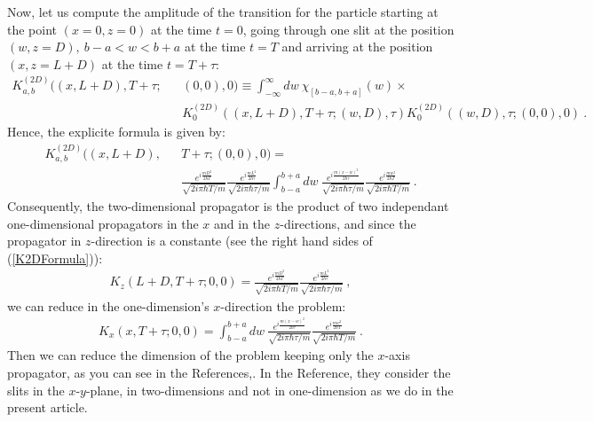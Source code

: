 \documentclass[12pt,aps,prb,preprint]{revtex4-1}   %
\begin{document}
Now, let us compute the amplitude of the transition for the particle 
starting at the point $(x=0,z=0)$ at the time $t=0$,
going through one slit at the position $(w,z=D),\ b-a<w<b+a$ at the time $t=T$
and arriving at the position $(x,z=L+D)$ at the time $t=T+\tau$: 
\begin{eqnarray*}
K_{a,b}^{(2D)}((x,L+D),T+\tau;&&(0,0),0)
\equiv\int_{-\infty}^{\infty}dw\ \chi_{[b-a,b+a]}(w)\times
{}\nonumber\\{}&&K_0^{(2D)}\left((x,L+D),T+\tau;(w,D),\tau\right)K_0^{(2D)}\left((w,D),\tau;(0,0),0\right)\ .
\end{eqnarray*}
Hence, the explicite formula is given by:
\begin{eqnarray}\label{K2DFormula}
K_{a,b}^{(2D)}((x,L+D),&&T+\tau;(0,0),0)=
{}\nonumber\\{}&&\frac{e^{i\frac{mD^2}{2\hbar T}}}{\sqrt{2i\pi\hbar T/m}} 
\frac{e^{i\frac{m L^2}{2\hbar\tau}}}{\sqrt{2i\pi\hbar\tau/m}}
\int_{b-a}^{b+a}dw\ \frac{e^{i\frac{m (x-w)^2}{2\hbar\tau}}}{\sqrt{2i\pi\hbar\tau/m}}
\frac{e^{i\frac{m w^2}{2\hbar T}}}{\sqrt{2i\pi\hbar T/m}}\ .
\end{eqnarray}
Consequently, the two-dimensional propagator is the product of two independant 
one-dimensional propagators in the $x$ and in the $z$-directions, 
and since the propagator in $z$-direction is a constante 
(see the right hand sides of (\ref{K2DFormula})):
\begin{eqnarray}\label{Kz}
K_z(L+D,T+\tau;0,0)=\frac{e^{i\frac{mD^2}{2\hbar T}}}{\sqrt{2i\pi\hbar T/m}}
\frac{e^{i\frac{m L^2}{2\hbar\tau}}}{\sqrt{2i\pi\hbar\tau/m}}\ ,
\end{eqnarray}
we can reduce in the one-dimension's $x$-direction the problem:
\begin{eqnarray}\label{Kx}
K_x(x,T+\tau;0,0)=\int_{b-a}^{b+a}dw\ \frac{e^{i\frac{m (x-w)^2}{2\hbar\tau}}}{\sqrt{2i\pi\hbar\tau/m}}
\frac{e^{i\frac{m w^2}{2\hbar T}}}{\sqrt{2i\pi\hbar T/m}}\ .
\end{eqnarray}
Then we can reduce the dimension of the problem keeping only the $x$-axis
propagator, as you can see in the References\cite{FH},\cite{Frabboni}.
In the Reference,\cite{Frabboni} they consider the slits in 
the $x$-$y$-plane, in two-dimensions and not in one-dimension 
as we do in the present article.
\end{document}
